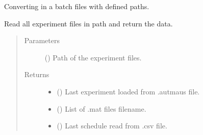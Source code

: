 \documentclass[letterpaper,10pt,english]{sphinxmanual}
\begin{document}

\begin{fulllineitems}
\label{\detokenize{NoSeMazeControl/Analysis:Analysis.Conversion.convert}}
\pysigstartsignatures
{}
\pysigstopsignatures
\sphinxAtStartPar
Converting in a batch files with defined paths.

\end{fulllineitems}


\begin{fulllineitems}
\label{\detokenize{NoSeMazeControl/Analysis:Analysis.Conversion.load_experiment}}
\pysigstartsignatures
{}
\pysigstopsignatures
\sphinxAtStartPar
Read all experiment files in path and return the data.
\begin{quote}\begin{description}
\item[{Parameters}] \leavevmode
\sphinxAtStartPar
{} () \textendash{} Path of the experiment files.

\item[{Returns}] \leavevmode
\sphinxAtStartPar
\begin{itemize}
\item {} 
\sphinxAtStartPar
{} () \textendash{} Last experiment loaded from .autmaus file.

\item {} 
\sphinxAtStartPar
{} () \textendash{} List of .mat files filename.

\item {} 
\sphinxAtStartPar
{} () \textendash{} Last schedule read from .csv file.

\end{itemize}


\end{description}\end{quote}

\end{fulllineitems}
\end{document}
